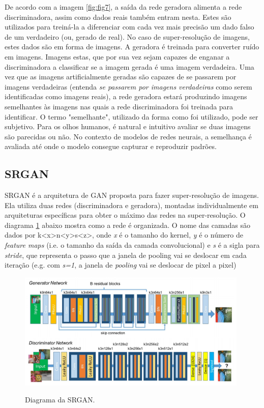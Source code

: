 De acordo com a imagem \ref{fig:fig7}, a saída da rede geradora alimenta a rede discriminadora, assim como dados reais também entram nesta. Estes são utilizados para treiná-la a diferenciar com cada vez mais precisão um dado falso de um verdadeiro (ou, gerado de real). No caso de super-resolução de imagens, estes dados são em forma de imagens. A geradora é treinada para converter ruído em imagens. Imagens estas, que por sua vez sejam capazes de enganar a discriminadora a classificar se a imagem gerada é uma imagem verdadeira. Uma vez que as imagens artificialmente geradas são capazes de se passarem por imagens verdadeiras (entenda \textit{se passarem por imagens verdadeiras} como serem identificadas como imagens reais), a rede geradora estará produzindo imagens semelhantes às imagens nas quais a rede discriminadora foi treinada para identificar. O termo "semelhante", utilizado da forma como foi utilizado, pode ser subjetivo. Para os olhos humanos, é natural e intuitivo avaliar se duas imagens são parecidas ou não. No contexto de modelos de redes neurais, a semelhança é avaliada até onde o modelo consegue capturar e reproduzir padrões.

\subsection{SRGAN}

SRGAN é a arquitetura de GAN proposta para fazer super-resolução de imagens. Ela utiliza duas redes (discriminadora e geradora), montadas individualmente em arquiteturas específicas para obter o máximo das redes na super-resolução. O diagrama \ref{fig:fig8} abaixo mostra como a rede é organizada. O nome das camadas são dados por k<x>n<y>s<z>, onde \textit{x} é o tamanho do kernel, \textit{y} é o número de \textit{feature maps} (i.e. o tamanho da saída da camada convolucional) e \textit{s} é a sigla para \textit{stride}, que representa o passo que a janela de pooling vai se deslocar em cada iteração (e.g. com \textit{s=1}, a janela de \textit{pooling} vai se deslocar de pixel a pixel) 

\begin{figure}[H]
    \centering
    \caption{Diagrama da SRGAN.}
    \includegraphics[width=11cm]{fig/SRGAN.png}
    \label{fig:fig8}
\end{figure}

